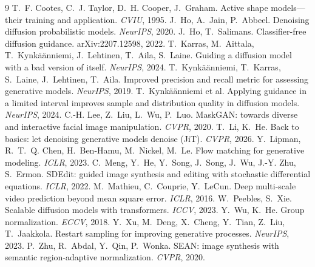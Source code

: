 \documentclass[11pt]{article}
\begin{document}
\begin{thebibliography}{9}\small
{} T.~F. Cootes, C.~J. Taylor, D.~H. Cooper,
J.~Graham. Active shape models---their training and application. \emph{CVIU}, 1995.
 J.~Ho, A.~Jain, P.~Abbeel. Denoising diffusion
probabilistic models. \emph{NeurIPS}, 2020.
 J.~Ho, T.~Salimans. Classifier-free diffusion
guidance. arXiv:2207.12598, 2022.
 T.~Karras, M.~Aittala, T.~Kynkäänniemi,
J.~Lehtinen, T.~Aila, S.~Laine. Guiding a diffusion model with a bad version of itself.
\emph{NeurIPS}, 2024.
 T.~Kynkäänniemi, T.~Karras,
S.~Laine, J.~Lehtinen, T.~Aila. Improved precision and recall metric for assessing
generative models. \emph{NeurIPS}, 2019.
 T.~Kynkäänniemi et al.
Applying guidance in a limited interval improves sample and distribution quality in
diffusion models. \emph{NeurIPS}, 2024.
 C.-H. Lee, Z.~Liu, L.~Wu, P.~Luo. MaskGAN:
towards diverse and interactive facial image manipulation. \emph{CVPR}, 2020.
 T.~Li, K.~He. Back to basics: let denoising
generative models denoise (JiT). \emph{CVPR}, 2026.
 Y.~Lipman, R.~T.~Q. Chen, H.~Ben-Hamu,
M.~Nickel, M.~Le. Flow matching for generative modeling. \emph{ICLR}, 2023.
 C.~Meng, Y.~He, Y.~Song, J.~Song, J.~Wu,
J.-Y. Zhu, S.~Ermon. SDEdit: guided image synthesis and editing with stochastic
differential equations. \emph{ICLR}, 2022.
 M.~Mathieu, C.~Couprie, Y.~LeCun. Deep
multi-scale video prediction beyond mean square error. \emph{ICLR}, 2016.
 W.~Peebles, S.~Xie. Scalable diffusion
models with transformers. \emph{ICCV}, 2023.
 Y.~Wu, K.~He. Group normalization. \emph{ECCV}, 2018.
 Y.~Xu, M.~Deng, X.~Cheng, Y.~Tian, Z.~Liu,
T.~Jaakkola. Restart sampling for improving generative processes. \emph{NeurIPS}, 2023.
 P.~Zhu, R.~Abdal, Y.~Qin, P.~Wonka. SEAN: image
synthesis with semantic region-adaptive normalization. \emph{CVPR}, 2020.
\end{thebibliography}
\end{document}
